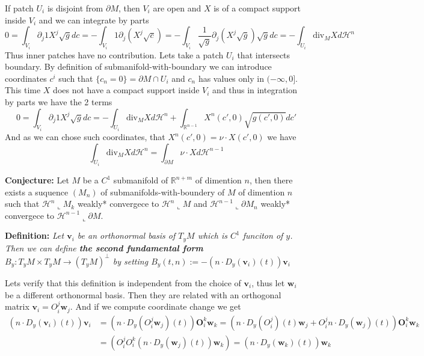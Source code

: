 \vspace{1ex}
If patch $U_i$ is disjoint from $\partial M$, then $V_i$ are open and $X$ is of
a compact support inside $V_i$ and we can integrate by parts
\[0=\int_{V_i}\partial_j 1X^j\sqrt gdc=-\int_{V_i}1\partial_j(X^j\sqrt c)=
-\int_{V_i}\frac{1}{\sqrt g}\partial_j(X^j\sqrt g)\sqrt gdc=-\int_{U_i}\text{div}_M Xd\mathcal H^n\]
Thus inner patches have no contribution. Lets take a patch $U_i$ that intersects
boundary. By definition of submanifold-with-boundary we can introduce coordinates
$c^i$ such that $\{c_n=0\}=\partial M\cap U_i$ and $c_n$ has values only in
$(-\infty,0]$. This time $X$ does not have a compact support inside $V_i$ and
thus in integration by parts we have the 2 terms
\[0=\int_{V_i}\partial_j 1X^j\sqrt gdc=-\int_{U_i}\text{div}_M Xd\mathcal H^n+\int_{\mathbb R^{n-1}}X^n(c',0)\sqrt{g(c',0)}dc'\]
And as we can chose such coordinates, that $X^n(c',0)=\nu\cdot X(c',0)$ we have
\[\int_{U_i}\text{div}_M Xd\mathcal H^n=\int_{\partial M}\nu\cdot Xd\mathcal H^{n-1}\]

\vspace{2ex}
\textbf{Conjecture:} Let $M$ be a $C^1$ submanifold of $\mathbb{R}^{n+m}$ of
dimention $n$, then there exists a suquence $(M_n)$ of submanifolds-with-boundery
of $M$ of dimention $n$ such that $\mathcal H^n\llcorner M_k$ weakly* convergece to
$\mathcal H^n\llcorner M$ and $\mathcal H^{n-1}\llcorner\partial M_n$ weakly* convergece to 
$\mathcal H^{n-1}\llcorner\partial M$.

\vspace{2ex}
\textbf{Definition:} \textit{Let $\mathbf{v}_i$ be an orthonormal basis of $T_yM$ which
is $C^1$ funciton of $y$. Then we can define \textbf{the second fundamental form}
$B_y:T_yM\times T_yM\rightarrow (T_yM)^\perp$ by setting $B_y(t,n):=-(n\cdot D_y
(\mathbf v_i)(t))\mathbf v_i$
}

\vspace{2ex} Lets verify that this definition is independent from the choice of
$\mathbf v_i$, thus let $\mathbf w_i$ be a different orthonormal basis. Then
they are related with an orthogonal matrix $\mathbf v_i=O_i^j\mathbf w_j$. And
if we compute coordinate change we get
\begin{align*}
    (n\cdot D_y(\mathbf v_i)(t))\mathbf v_i&=(n\cdot D_y(O_i^j\mathbf w_j)(t))\mathbf O_i^k\mathbf w_k
=(n\cdot D_y(O_i^j)(t)\mathbf w_j + O_i^j n\cdot D_y(\mathbf w_j)(t))\mathbf O_i^k\mathbf w_k\\
    &=(O_i^jO_i^k(n\cdot D_y(\mathbf w_j)(t))\mathbf w_k)=(n\cdot D_y(\mathbf w_k)(t))\mathbf w_k
\end{align*}

